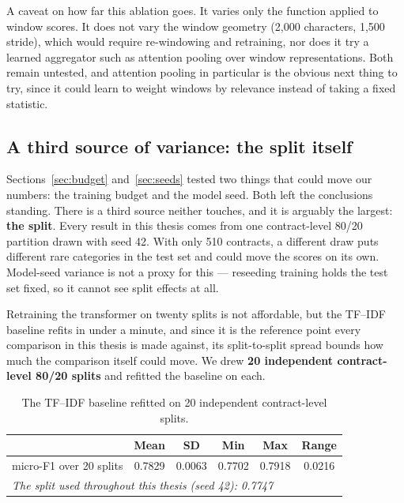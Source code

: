 A caveat on how far this ablation goes. It varies only the function applied to window scores. It does not vary the window geometry (2{,}000 characters, 1{,}500 stride), which would require re-windowing and retraining, nor does it try a learned aggregator such as attention pooling over window representations. Both remain untested, and attention pooling in particular is the obvious next thing to try, since it could learn to weight windows by relevance instead of taking a fixed statistic.

\subsection{A third source of variance: the split itself}
\label{sec:splitvar}
Sections~\ref{sec:budget} and~\ref{sec:seeds} tested two things that could move our numbers: the training budget and the model seed. Both left the conclusions standing. There is a third source neither touches, and it is arguably the largest: \textbf{the split}. Every result in this thesis comes from one contract-level 80/20 partition drawn with seed 42. With only 510 contracts, a different draw puts different rare categories in the test set and could move the scores on its own. Model-seed variance is not a proxy for this --- reseeding training holds the test set fixed, so it cannot see split effects at all.

Retraining the transformer on twenty splits is not affordable, but the TF--IDF baseline refits in under a minute, and since it is the reference point every comparison in this thesis is made against, its split-to-split spread bounds how much the comparison itself could move. We drew \textbf{20 independent contract-level 80/20 splits} and refitted the baseline on each.

\begin{table}[ht]
\centering
\caption{The TF--IDF baseline refitted on 20 independent contract-level splits.}
\label{tab:splitvar}
\small
\begin{tabular}{lccccc}
\toprule
 & \textbf{Mean} & \textbf{SD} & \textbf{Min} & \textbf{Max} & \textbf{Range}\\
\midrule
micro-F1 over 20 splits & 0.7829 & 0.0063 & 0.7702 & 0.7918 & 0.0216\\
\midrule
\multicolumn{6}{l}{\emph{The split used throughout this thesis (seed 42): 0.7747}}\\
\bottomrule
\end{tabular}
\end{table}

